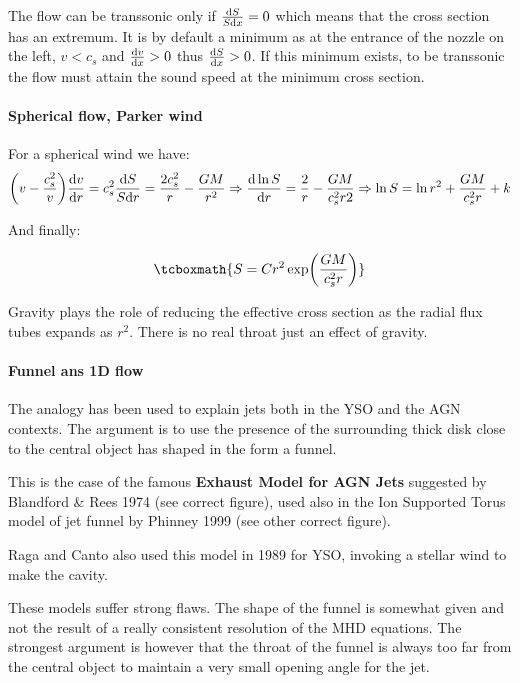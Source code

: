 \documentclass[10pt,a4paper,english]{article}
\let\originalleft\left
\let\originalright\right
\renewcommand{\left}{\mathopen{}\mathclose\bgroup\originalleft}
\renewcommand{\right}{\aftergroup\egroup\originalright}
\begin{document}
The flow can be transsonic only if $\frac{\mathrm{d} S}{S\mathrm{d} x} = 0 $ which means that the cross section
has an extremum. It is by default a minimum as at the entrance of the nozzle on the left,  $v<c_s$ and
$\frac{\mathrm{d} v}{\mathrm{d} x} > 0$ thus $\frac{\mathrm{d} S}{\mathrm{d} x} > 0 $. If this minimum exists, to be transsonic the flow must
attain the sound speed at the minimum cross section.

\paragraph{Spherical flow, Parker wind}

For a spherical wind we have:
\begin{equation}
    \left( v - \frac{c_s^2}{v}  \right)\frac{\d v}{\d r} = c_s^2\frac{\d S}{S\d r}
    = \frac{2c_s^2}{r} - \frac{GM}{r^2} \Rightarrow \frac{\d \ln S}{\d r} =
    \frac{2}{r} - \frac{GM}{c_s^2 r2}
    \Rightarrow \ln S = \ln r^2 +\frac{GM}{c_s^2r} + k
\end{equation}

And finally:

\begin{equation}
    \tcboxmath{S = Cr^2 \exp\left(\frac{GM}{c_s^2 r}\right)}
\end{equation}

Gravity plays the role of reducing the effective cross section as the radial flux tubes expands
as $r^2$. There is no real throat just an effect of gravity.

\paragraph{Funnel ans 1D flow}
The analogy has been used to explain jets both in the YSO  and the AGN contexts. The argument
is to use the presence of the surrounding thick disk close to the central object has shaped in
the form a funnel.

This is the case of the famous \textbf{ Exhaust Model for AGN Jets} suggested by
Blandford  \&  Rees 1974 (see correct figure), used also in the Ion Supported Torus
model of jet funnel by Phinney 1999 (see other correct figure).


Raga and Canto also used this model in 1989 for YSO, invoking a stellar wind to make
the cavity.


These models suffer strong flaws. The shape of the funnel is somewhat given and
not the result of a really consistent resolution of the MHD equations. The strongest argument
is however that the throat of the funnel is always too far from the central object to maintain
a very small opening angle for the jet.
\end{document}
